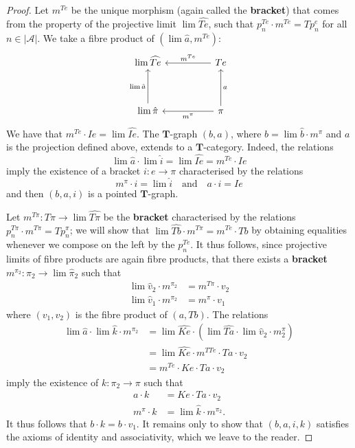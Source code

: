\documentclass[fleqn]{article}
\newcommand{\oldpage}[1]{\marginpar{\footnotesize$\Big\vert$ \textit{p.~#1}}}
\newcommand{\unsure}[1]{{\color{purple}\textbf{#1}}}
\newcommand{\TT}{\mathbf{T}}
\newcommand{\textand}{\quad\text{and}\quad}
\newcommand{\cat}[1]{\mathcal{#1}}
\newcommand{\set}[1]{|#1|}
\begin{document}
\begin{proof}
  \oldpage{233}
  Let $m^{Te}$ be the unique morphism (again called the \unsure{bracket}) that comes from the property of the projective limit $\lim\widehat{Te}$, such that $p_n^{Te}\cdot m^{Te}=Tp_n^e$ for all $n\in\set{\cat{A}}$.
  We take a fibre product of $(\lim\hat{a},m^{Te})$:
  \[
    \begin{tikzcd}[sep=huge]
      \lim\widehat{Te}
    & Te
        \ar[l,swap,"m^{Te}"]
    \\\lim\hat{\pi}
        \ar[u,"\lim\hat{a}"]
    & \pi
        \ar[l,"m^\pi"]
        \ar[u,swap,"a"]
    \end{tikzcd}
  \]
  We have that $m^{Te}\cdot Ie=\lim\widehat{Ie}$.
  The $\TT$-graph $(b,a)$, where $b=\lim\hat{b}\cdot m^\pi$ and $a$ is the projection defined above, extends to a $\TT$-category.
  Indeed, the relations
  \[
    \lim\hat{a}\cdot\lim\hat{i}
    = \lim\widehat{Ie}
    = m^{Te}\cdot Ie
  \]
  imply the existence of a bracket $i\colon e\to\pi$ characterised by the relations
  \[
    m^\pi\cdot i
    = \lim\hat{i}
    \textand
    a\cdot i
    = Ie
  \]
  and then $(b,a,i)$ is a pointed $\TT$-graph.

  Let $m^{T\pi}\colon T\pi\to\lim\widehat{T\pi}$ be the \unsure{bracket} characterised by the relations $p_n^{T\pi}\cdot m^{T\pi}=Tp_n^\pi$;
  we will show that $\lim\widehat{Tb}\cdot m^{T\pi}=m^{Te}\cdot Tb$ by obtaining equalities whenever we compose on the left by the $p_n^{Te}$.
  It thus follows, since projective limits of fibre products are again fibre products, that there exists a \unsure{bracket} $m^{\pi_2}\colon\pi_2\to\lim\hat{\pi}_2$ such that
  \[
    \begin{aligned}
      \lim\hat{v}_2\cdot m^{\pi_2}
      &= m^{T\pi}\cdot v_2
    \\\lim\hat{v}_1\cdot m^{\pi_2}
      &= m^\pi\cdot v_1
    \end{aligned}
  \]
  where $(v_1,v_2)$ is the fibre product of $(a,Tb)$.
  The relations
  \[
    \begin{aligned}
      \lim\hat{a}\cdot\lim\hat{k}\cdot m^{\pi_2}
      &= \lim\widehat{Ke}\cdot(\lim\widehat{Ta}\cdot\lim\hat{v}_2\cdot m^\pi_2)
    \\&= \lim\widehat{Ke}\cdot m^{TTe}\cdot Ta\cdot v_2
    \\&= m^{Te}\cdot Ke\cdot Ta\cdot v_2
    \end{aligned}
  \]
  imply the existence of $k\colon\pi_2\to\pi$ such that
  \[
    \begin{aligned}
      a\cdot k
      &= Ke\cdot Ta\cdot v_2
    \\m^\pi\cdot k
      &= \lim\hat{k}\cdot m^{\pi_2}.
    \end{aligned}
  \]
  It thus follows that $b\cdot k=b\cdot v_1$.
  It remains only to show that $(b,a,i,k)$ satisfies the axioms of identity and associativity, which we leave to the reader.


\end{proof}
\end{document}
